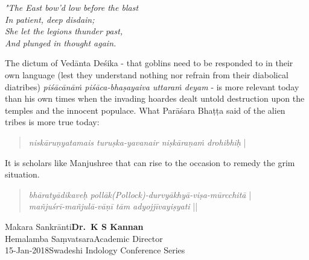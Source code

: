 \begin{myquote}
{{\sl "The East bow'd low before the blast}}\\
{\sl In patient, deep disdain;}\\
{\sl She let the legions thunder past,}\\
{\sl And plunged in thought again.}
\end{myquote}

The dictum of Vedānta Deśika - that goblins need to be responded to in their own language (lest they understand nothing nor refrain from their diabolical diatribes) {\sl piśācānāṁ piśāca-bhaṣayaiva uttaraṁ deyam} - is more relevant today than his own times when the invading hoardes dealt untold destruction upon the temples and the innocent populace. What Parāśara Bhaṭṭa said of the alien tribes is more true today:
\begin{quote}
{{\sl niskāruṇyatamais turuṣka-yavanair niṣkāraṇaṁ drohibhiḥ}} |
\end{quote}

It is scholars like Manjushree that can rise to the occasion to remedy the grim situation.
\begin{quote}
{{\sl bhāratyādikaveḥ pollāk(Pollock)-durvyākhyā-viṣa-mūrcchitā}} |\\
{\sl mañjuśrī-mañjulā-vāṇī tām adyojjīvayiṣyati} ||
\end{quote}


\noindent
Makara Sankrānti\hfill	{\bf Dr.~K S Kannan}\\
Hemalamba Saṃvatsara\hfill Academic Director\\
15-Jan-2018\hfill Swadeshi Indology Conference Series

